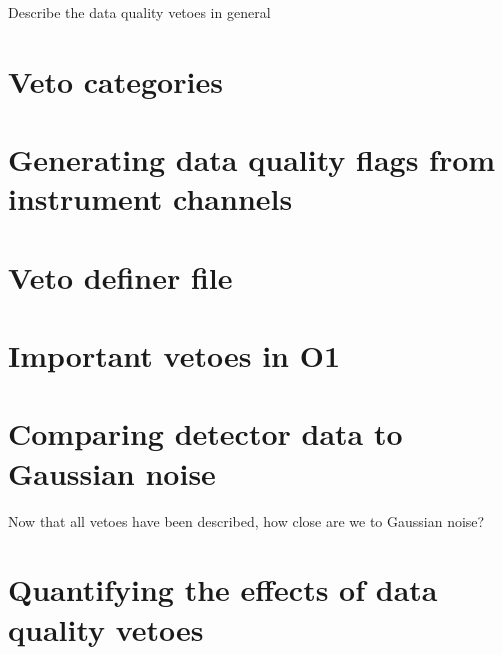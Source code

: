 Describe the data quality vetoes in general

\section{Veto categories}

\section{Generating data quality flags from instrument channels}

\section{Veto definer file}

\section{Important vetoes in O1}

\section{Comparing detector data to Gaussian noise}

Now that all vetoes have been described, how close are we to Gaussian noise?

\section{Quantifying the effects of data quality vetoes}
